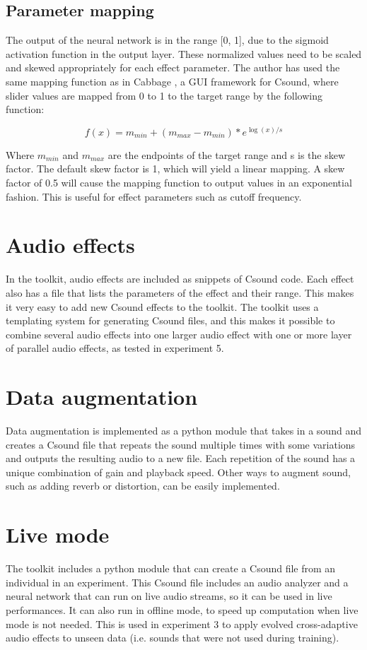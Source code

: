\subsection{Parameter mapping}
The output of the neural network is in the range [0, 1], due to the sigmoid activation function in the output layer. These normalized values need to be scaled and skewed appropriately for each effect parameter. The author has used the same mapping function as in Cabbage \citep{walsh2008}, a GUI framework for Csound, where slider values are mapped from 0 to 1 to the target range by the following function:

$$f(x)=m_{min}+(m_{max}-m_{min})*e^{\log(x)/s}$$

Where $m_{min}$ and $m_{max}$ are the endpoints of the target range and s is the skew factor. The default skew factor is 1, which will yield a linear mapping. A skew factor of 0.5 will cause the mapping function to output values in an exponential fashion. This is useful for effect parameters such as cutoff frequency.

\section{Audio effects}
In the toolkit, audio effects are included as snippets of Csound code. Each effect also has a file that lists the parameters of the effect and their range. This makes it very easy to add new Csound effects to the toolkit. The toolkit uses a templating system for generating Csound files, and this makes it possible to combine several audio effects into one larger audio effect with one or more layer of parallel audio effects, as tested in experiment 5.

\section{Data augmentation}
Data augmentation is implemented as a python module that takes in a sound and creates a Csound file that repeats the sound multiple times with some variations and outputs the resulting audio to a new file. Each repetition of the sound has a unique combination of gain and playback speed. Other ways to augment sound, such as adding reverb or distortion, can be easily implemented.

\section{Live mode}
The toolkit includes a python module that can create a Csound file from an individual in an experiment. This Csound file includes an audio analyzer and a neural network that can run on live audio streams, so it can be used in live performances. It can also run in offline mode, to speed up computation when live mode is not needed. This is used in experiment 3 to apply evolved cross-adaptive audio effects to unseen data (i.e. sounds that were not used during training).

